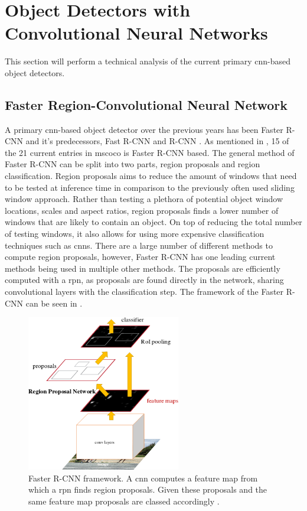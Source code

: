 \section{Object Detectors with Convolutional Neural Networks}\label{sec:objdet}
This section will perform a technical analysis of the current primary \gls{cnn}-based object detectors.

\subsection{Faster Region-Convolutional Neural Network}
A primary \gls{cnn}-based object detector over the previous years has been Faster R-CNN \cite{fasterrcnn} and it's predecessors, Fast R-CNN \cite{fastrcnn} and R-CNN \cite{rcnn}. As mentioned in , 15 of the 21 current entries in \gls{mscoco} is Faster R-CNN based. The general method of Faster R-CNN can be split into two parts, region proposals and region classification. Region proposals aims to reduce the amount of windows that need to be tested at inference time in comparison to the previously often used sliding window approach. Rather than testing a plethora of potential object window locations, scales and aspect ratios, region proposals finds a lower number of windows that are likely to contain an object. On top of reducing the total number of testing windows, it also allows for using more expensive classification techniques such as \glspl{cnn}. There are a large number of different methods to compute region proposals, however, Faster R-CNN has one leading current methods being used in multiple other methods. The proposals are efficiently computed with a \gls{rpn}, as proposals are found directly in the network, sharing convolutional layers with the classification step. The framework of the Faster R-CNN can be seen in . 

\begin{figure}[H]
  \centering
    \includegraphics[width=0.6\textwidth]{Figs/Techanal/fasterframework.png}
      \caption{Faster R-CNN framework. A \gls{cnn} computes a feature map from which a \gls{rpn} finds region proposals. Given these proposals and the same feature map proposals are classed accordingly \cite{fasterrccn}.}
    \label{fig:fasterframework}
\end{figure}

